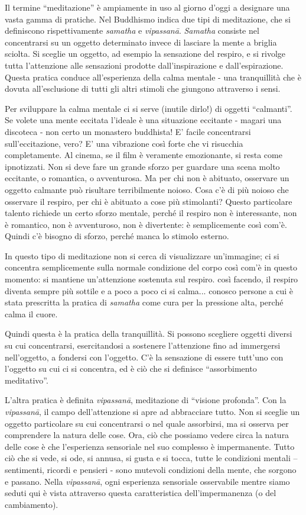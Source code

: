 
Il termine ``meditazione'' è ampiamente in uso al giorno d'oggi a
designare una vasta gamma di pratiche. Nel Buddhismo indica due tipi di
meditazione, che si definiscono rispettivamente \textit{samatha} e \textit{vipassanā}.
\textit{Samatha} consiste nel concentrarsi su un oggetto determinato invece di
lasciare la mente a briglia sciolta. Si sceglie un oggetto, ad esempio
la sensazione del respiro, e si rivolge tutta l'attenzione alle
sensazioni prodotte dall'inspirazione e dall'espirazione. Questa pratica
conduce all'esperienza della calma mentale - una tranquillità che è
dovuta all'esclusione di tutti gli altri stimoli che giungono attraverso
i sensi.

Per sviluppare la calma mentale ci si serve (inutile dirlo!) di oggetti
``calmanti”. Se volete una mente eccitata l'ideale è una situazione
eccitante - magari una discoteca - non certo un monastero buddhista! E'
facile concentrarsi sull'eccitazione, vero? E' una vibrazione così forte
che vi risucchia completamente. Al cinema, se il film è veramente
emozionante, si resta come ipnotizzati. Non si deve fare un grande
sforzo per guardare una scena molto eccitante, o romantica, o
avventurosa. Ma per chi non è abituato, osservare un oggetto calmante
può risultare terribilmente noioso. Cosa c'è di più noioso che osservare
il respiro, per chi è abituato a cose più stimolanti? Questo particolare
talento richiede un certo sforzo mentale, perché il respiro non è
interessante, non è romantico, non è avventuroso, non è divertente: è
semplicemente così com'è. Quindi c'è bisogno di sforzo, perché manca lo
stimolo esterno.

In questo tipo di meditazione non si cerca di visualizzare un'immagine;
ci si concentra semplicemente sulla normale condizione del corpo così
com'è in questo momento: si mantiene un'attenzione sostenuta sul
respiro. così facendo, il respiro diventa sempre più sottile e a poco a
poco ci si calma... conosco persone a cui è stata prescritta la pratica
di \textit{samatha} come cura per la pressione alta, perché calma il cuore.

Quindi questa è la pratica della tranquillità. Si possono scegliere
oggetti diversi su cui concentrarsi, esercitandosi a sostenere
l'attenzione fino ad immergersi nell'oggetto, a fondersi con l'oggetto.
C'è la sensazione di essere tutt'uno con l'oggetto su cui ci si
concentra, ed è ciò che si definisce ``assorbimento meditativo”.

L'altra pratica è definita \textit{vipassanā}, meditazione di ``visione profonda”.
Con la \textit{vipassanā}, il campo dell'attenzione si apre ad abbracciare tutto.
Non si sceglie un oggetto particolare su cui concentrarsi o nel quale
assorbirsi, ma si osserva per comprendere la natura delle cose. Ora, ciò
che possiamo vedere circa la natura delle cose è che l'esperienza
sensoriale nel suo complesso è impermanente. Tutto ciò che si vede, si
ode, si annusa, si gusta e si tocca, tutte le condizioni mentali –
sentimenti, ricordi e pensieri - sono mutevoli condizioni della mente,
che sorgono e passano. Nella \textit{vipassanā}, ogni esperienza sensoriale
osservabile mentre siamo seduti qui è vista attraverso questa
caratteristica dell'impermanenza (o del cambiamento).

